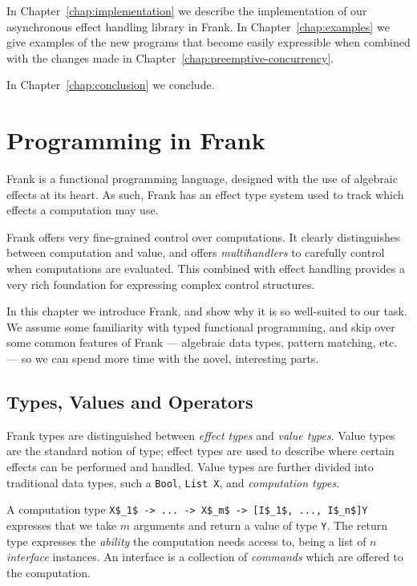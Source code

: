 \documentclass[msc,deptreport,cs]{infthesis} %
\newcommand{\code}[1]{\lstinline{#1}}
\newcommand{\todo}[1]
           {{\par\noindent\small\color{RoyalPurple}
  \framebox{\parbox{\dimexpr\linewidth-2\fboxsep-2\fboxrule}
    {\textbf{TODO:} #1}}}}
\begin{document}
\todo{Fix above}

In Chapter~\ref{chap:implementation} we describe the implementation of our
asynchronous effect handling library in Frank. In Chapter~\ref{chap:examples} we
give examples of the new programs that become easily expressible when combined
with the changes made in Chapter~\ref{chap:preemptive-concurrency}.

In Chapter~\ref{chap:conclusion} we conclude.






\chapter{Programming in Frank}
\label{chap:programming-in-frank}

Frank is a functional programming language, designed with the use of algebraic
effects at its heart. As such, Frank has an effect type system used to track
which effects a computation may use.

Frank offers very fine-grained control over computations. It clearly
distinguishes between computation and value, and offers \emph{multihandlers} to
carefully control when computations are evaluated. This combined with effect
handling provides a very rich foundation for expressing complex control
structures.

In this chapter we introduce Frank, and show why it is so well-suited to our
task. We assume some familiarity with typed functional programming, and skip
over some common features of Frank --- algebraic data types, pattern matching,
etc. --- so we can spend more time with the novel, interesting parts.

\section{Types, Values and Operators}

Frank types are distinguished between \emph{effect types} and \emph{value
  types}. Value types are the standard notion of type; effect types are
used to describe where certain effects can be performed and handled. Value types are further divided into traditional data types, such a \code{Bool},
\code{List X}, and \emph{computation types}.

A computation type
%
\lstinline[mathescape]!X$_1$ -> ... -> X$_m$ -> [I$_1$, ..., I$_n$]Y!
%
expresses that we take $m$ arguments and return a value of type \code{Y}. The
return type expresses the \emph{ability} the computation needs access to, being
a list of $n$ \emph{interface} instances. An interface is a collection of
\emph{commands} which are offered to the computation.
\end{document}

